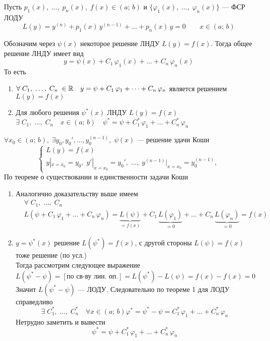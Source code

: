 \begin{Th}
    Пусть $p_1(x),\; \dots,\; p_n(x),\; f(x) \in (a;\, b)$ и $\{\varphi_1(x),\; \dots,\; \varphi_n(x)\}$ --- ФСР ЛОДУ
    \[
        L(y) = y^{(n)} + p_1(x)\,y^{(n - 1)} + \dots + p_n(x)\,y = 0 \qquad x\in (a;\,b)    
    \]
    
    Обозначим через $\psi(x)$ некоторое решение ЛНДУ $L(y) = f(x)$. Тогда общее решение ЛНДУ имеет вид
    \[
        y = \psi(x) + C_1\,\varphi_1(x) + \dots + C_n\,\varphi_n(x)
    \]
    То есть
    \begin{enumerate}
        \item $\forall \; C_1,\; \dots,\; C_n \; \in \mathbb{R} \quad y = \psi + C_1\,\varphi_1 + \dots + C_n\,\varphi_n$ является решением $L(y) = f(x)$
            
        \item Для любого решения $\psi^*(x)$ ЛНДУ $L(y) = f(x)$\\
        $\exists \; C_1,\; \dots,\; C_n \quad x\in(a;\,b) \quad \psi^* = \psi + C_1^*\,\varphi_1 + \dots + C_n^*\,\varphi_n$
            
    \end{enumerate}
\end{Th}

\begin{Proof}
    
    $\forall x_0 \in (a;\,b),\; \exists y_0, y_0', \dots, y_0^{(n-1)},\; \psi(x)$ --- решение здачи Коши
    \[
        \begin{cases}
            L(y) = f(x)\\
            y|_{x = x_0} = y_0,\; y'|_{x = x_0} = y_0',\; \dots,\; y^{(n-1)}|_{x = x_0} = y^{(n-1)}_0,
        \end{cases}
    \]
    По теореме о существовании и единственности задачи Коши
    \begin{enumerate}
        \item Аналогично доказательству выше имеем
        \begin{align*}
            &\forall \; C_1,\; \dots,\; C_n\\
            &L(\psi + C_1\,\varphi_1 + \dots + C_n\,\varphi_n) = \underbrace{L(\psi)}_{= f(x)} + C_1\,\underbrace{L(\varphi_1)}_{= 0} + \dots + C_n\,\underbrace{L(\varphi_n)}_{= 0} = f(x)
        \end{align*}
        
        \item $y = \psi^*(x)$ решение $L(\psi^*) = f(x)$, с другой стороны $L(\psi) = f(x)$ тоже решение (по усл.)\\
        Тогда рассмотрим следующее выражение
        \[
            L(\psi^* - \psi) = [\text{по св-ву лин. оп.}] = L(\psi^*) - L(\psi) = f(x) - f(x) = 0
        \]
        Значит $L(\psi^* - \psi)$ --- ЛОДУ. Следовательно по теореме 1 для ЛОДУ справедливо
        \[
            \exists \; C_1^*,\; \dots,\; C_n^* \quad \forall x\in(a;\,b)  \varphi^* = \psi^* - \psi = C_1^*\,\varphi_1 + \dots + C_n^*\,\varphi_n 
        \]
        Нетрудно заметить и вывести
        \[
            \psi^* = \psi + C_1^*\,\varphi_1 + \dots + C_n^*\,\varphi_n
        \]
    \end{enumerate}
\end{Proof}